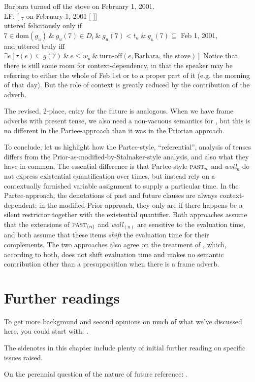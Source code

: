 \ex Barbara turned off the stove on February 1, 2001.\\
LF: [ \past$_{7}$ on February 1, 2001 [ ]]\\
uttered felicitously only if \\
\hfill
$7\in \text{dom}(g_{u})\ \&\ g_{u}(7)\in D_{i}\ \&\ g_{u}(7) < t_{u}\ \&\ g_{u}(7) \subseteq$
Feb 1, 2001,\\
and uttered truly iff $\exists e [\tau(e) \subseteq g(7)\ \&\ e \le w_{u}\ \& \
\text{turn-off}(e,\text{Barbara, the stove})]$
\xe
%
Notice that there is still some room for context-dependency, in that the speaker
may be referring to either the whole of Feb 1st or to a proper part of it (e.g.
the morning of that day). But the role of context is greatly reduced by the
contribution of the adverb.

The revised, 2-place, entry for the future is analogous. When we have frame
adverbs with present tense, we also need a non-vacuous semantics for \pres, but
this is no different in the Partee-approach than it was in the Priorian
approach.

To conclude, let us highlight how the Partee-style, ``referential'', analysis of
tenses differs from the Prior-as-modified-by-Stalnaker-style analysis, and also
what they have in common. The essential difference is that Partee-style
$\textsc{past}_{n}$ and \emph{woll}$_{n}$ do not express existential quantification over
times, but instead rely on a contextually furnished variable assignment to
supply a particular time. In the Partee-approach, the denotations of past and
future clauses are always context-dependent; in the modified-Prior approach,
they only are if there happens be a silent restrictor together with the
existential quantifier. Both approaches assume that the extensions of
$\textsc{past}_{(n)}$ and \emph{woll}$_{(n)}$ are sensitive to the evaluation time, and
both assume that these items \emph{shift} the evaluation time for their
complements. The two approaches also agree on the treatment of \pres, which,
according to both, does not shift evaluation time and makes no semantic
contribution other than a presupposition when there is a frame adverb.

\section{Further readings}
\label{sec:tense-readings}

To get more background and second opinions on much of what we've discussed here,
you could start with: \cite{kusumoto-2005-times,stechow-beck-2015-event-times}.

The sidenotes in this chapter include plenty of initial further reading on
specific issues raised.

On the perennial question of the nature of future reference: \cite{bochnak-2019-FutureReference,cariani-2022-FutureDisplacementModality}.

